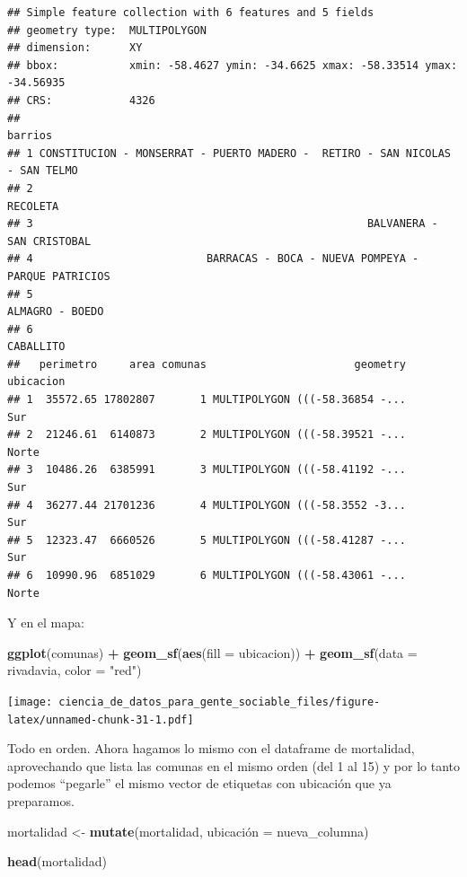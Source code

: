 \documentclass[spanish,]{book}
\newenvironment{Shaded}{\begin{snugshade}}{\end{snugshade}}
\newcommand{\DataTypeTok}[1]{\textcolor[rgb]{0.13,0.29,0.53}{#1}}
\newcommand{\KeywordTok}[1]{\textcolor[rgb]{0.13,0.29,0.53}{\textbf{#1}}}
\newcommand{\NormalTok}[1]{#1}
\newcommand{\OperatorTok}[1]{\textcolor[rgb]{0.81,0.36,0.00}{\textbf{#1}}}
\newcommand{\StringTok}[1]{\textcolor[rgb]{0.31,0.60,0.02}{#1}}
\begin{document}
\begin{verbatim}
## Simple feature collection with 6 features and 5 fields
## geometry type:  MULTIPOLYGON
## dimension:      XY
## bbox:           xmin: -58.4627 ymin: -34.6625 xmax: -58.33514 ymax: -34.56935
## CRS:            4326
##                                                                        barrios
## 1 CONSTITUCION - MONSERRAT - PUERTO MADERO -  RETIRO - SAN NICOLAS - SAN TELMO
## 2                                                                     RECOLETA
## 3                                                    BALVANERA - SAN CRISTOBAL
## 4                           BARRACAS - BOCA - NUEVA POMPEYA - PARQUE PATRICIOS
## 5                                                              ALMAGRO - BOEDO
## 6                                                                    CABALLITO
##   perimetro     area comunas                       geometry ubicacion
## 1  35572.65 17802807       1 MULTIPOLYGON (((-58.36854 -...       Sur
## 2  21246.61  6140873       2 MULTIPOLYGON (((-58.39521 -...     Norte
## 3  10486.26  6385991       3 MULTIPOLYGON (((-58.41192 -...       Sur
## 4  36277.44 21701236       4 MULTIPOLYGON (((-58.3552 -3...       Sur
## 5  12323.47  6660526       5 MULTIPOLYGON (((-58.41287 -...       Sur
## 6  10990.96  6851029       6 MULTIPOLYGON (((-58.43061 -...     Norte
\end{verbatim}

Y en el mapa:

\begin{Shaded}
\begin{Highlighting}[]
\KeywordTok{ggplot}\NormalTok{(comunas) }\OperatorTok{+}
\StringTok{    }\KeywordTok{geom_sf}\NormalTok{(}\KeywordTok{aes}\NormalTok{(}\DataTypeTok{fill =}\NormalTok{ ubicacion)) }\OperatorTok{+}
\StringTok{    }\KeywordTok{geom_sf}\NormalTok{(}\DataTypeTok{data =}\NormalTok{ rivadavia, }\DataTypeTok{color =} \StringTok{"red"}\NormalTok{)}
\end{Highlighting}
\end{Shaded}

\texttt{[image: ciencia\_de\_datos\_para\_gente\_sociable\_files/figure-latex/unnamed-chunk-31-1.pdf]}

Todo en orden. Ahora hagamos lo mismo con el dataframe de mortalidad, aprovechando que lista las comunas en el mismo orden (del 1 al 15) y por lo tanto podemos ``pegarle'' el mismo vector de etiquetas con ubicación que ya preparamos.

\begin{Shaded}
\begin{Highlighting}[]
\NormalTok{mortalidad <-}\StringTok{ }\KeywordTok{mutate}\NormalTok{(mortalidad, ubicación =}\StringTok{ }\NormalTok{nueva_columna)}
                         
\KeywordTok{head}\NormalTok{(mortalidad)}
\end{Highlighting}
\end{Shaded}
\end{document}
